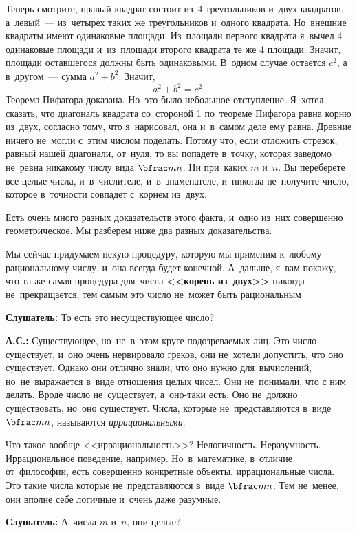 Теперь смотрите, правый квадрат состоит из~4 треугольников и~двух квадратов, а~левый~---
из~четырех таких же треугольников и~одного квадрата. Но~внешние квадраты имеют одинаковые площади.
Из~площади первого квадрата я~вычел 4 одинаковые площади и~из~площади второго квадрата те же 4
площади. Значит, площади оставшегося должны быть одинаковыми. В~одном случае остается $c^{2}$, а в~другом~--- сумма $a^{2}+b^{2}$.
Значит, $$a^{2}+b^{2}=c^{2}.$$ Теорема Пифагора доказана. Но~это было небольшое
отступление. Я~хотел сказать, что диагональ квадрата со~стороной 1 по~теореме Пифагора равна корню
из~двух, согласно тому, что я~нарисовал, она и~в~самом деле ему равна.
 Древние ничего не~могли
с~этим числом поделать. Потому что, если отложить отрезок, равный нашей диагонали, от~нуля, то вы
попадете в~точку, которая заведомо не~равна никакому числу вида $\bfrac mn$. Ни при~каких $m$ и~$n$. Вы
переберете все целые числа, и~в~числителе, и~в~знаменателе, и~никогда не~получите число, которое
в~точности совпадет с~корнем из~двух.

Есть очень много разных доказательств этого факта, и~одно из~них совершенно геометрическое. Мы разберем ниже два разных доказательства.

Мы сейчас придумаем некую процедуру, которую мы применим к~любому рациональному числу, и~она всегда
будет конечной. А~дальше, я~вам покажу, что та же самая процедура для~числа \textbf{<<корень из~двух>>}
никогда не~прекращается, тем самым это число не~может быть рациональным

\textbf{Слушатель:} То есть это несуществующее число?

\textbf{А.С.:} Существующее, но~не~в~этом круге подозреваемых лиц. Это число существует, и~оно
очень нервировало греков, они не~хотели допустить, что оно существует. Однако они отлично знали,
что оно нужно для~вычислений, но~не~выражается в~виде отношения целых чисел. Они не~понимали, что с ним делать.
 Вроде число не~существует, а~оно-таки есть. Оно не~должно существовать, но~оно существует.
Числа, которые не~представляются в~виде $\bfrac mn$, называются \textit{иррациональными}.

Что такое вообще <<иррациональность>>? Нелогичность. Неразумность. Иррациональное поведение,
например. Но~в~математике, в~отличие от~философии, есть совершенно конкретные объекты,
иррациональные числа. Это такие числа которые не~представляются в~виде $\bfrac mn$. Тем не~менее, они
вполне себе логичные и~очень даже разумные.

\textbf{Слушатель:} А~числа $m$ и~$n$, они целые?

